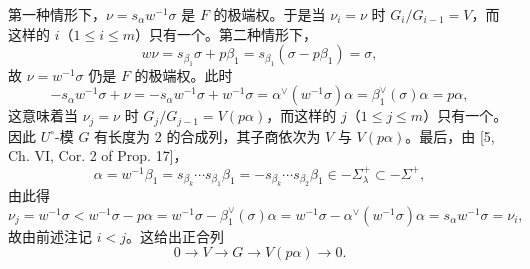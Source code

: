 第一种情形下，$\nu=s_\alpha w^{-1}\sigma$ 是 $F$ 的极端权。于是当 $\nu_i=\nu$ 时 $G_i/G_{i-1}=V$，而这样的 $i$（$1\le i\le m$）只有一个。第二种情形下，
$$w\nu=s_{\beta_1}\sigma+p\beta_1=s_{\beta_1}(\sigma-p\beta_1)=\sigma,$$
故 $\nu=w^{-1}\sigma$ 仍是 $F$ 的极端权。此时
$$-s_\alpha w^{-1}\sigma+\nu=-s_\alpha w^{-1}\sigma+w^{-1}\sigma=\alpha^\vee(w^{-1}\sigma)\alpha=\beta_1^\vee(\sigma)\alpha=p\alpha,$$
这意味着当 $\nu_j=\nu$ 时 $G_j/G_{j-1}=V(p\alpha)$，而这样的 $j$（$1\le j\le m$）只有一个。因此 $U^\circ$-模 $G$ 有长度为 $2$ 的合成列，其子商依次为 $V$ 与 $V(p\alpha)$。最后，由 [5, Ch. VI, Cor. 2 of Prop. 17]，
$$\alpha=w^{-1}\beta_1=s_{\beta_k}\cdots s_{\beta_1}\beta_1=-s_{\beta_k}\cdots s_{\beta_2}\beta_1\in-\Sigma_\lambda^+\subset-\Sigma^+,$$
由此得
$$\nu_j=w^{-1}\sigma<w^{-1}\sigma-p\alpha=w^{-1}\sigma-\beta_1^\vee(\sigma)\alpha=w^{-1}\sigma-\alpha^\vee(w^{-1}\sigma)\alpha=s_\alpha w^{-1}\sigma=\nu_i,$$
故由前述注记 $i<j$。这给出正合列
$$0\longrightarrow V\longrightarrow G\longrightarrow V(p\alpha)\longrightarrow 0.$$
